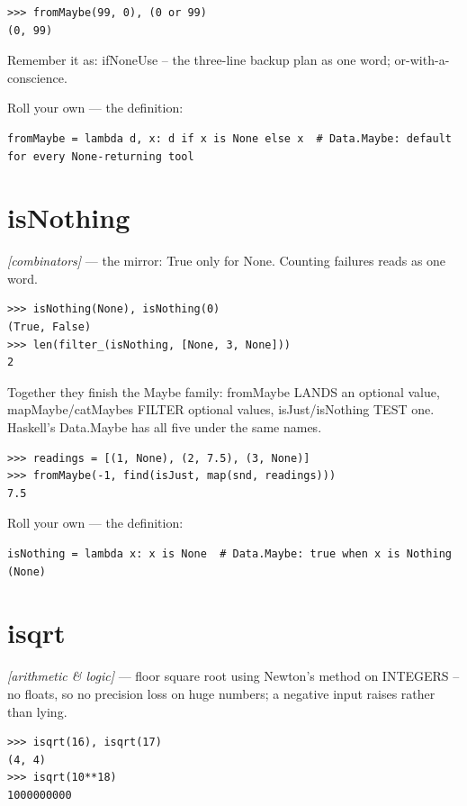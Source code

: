 \documentclass[11pt,letterpaper]{book}
\begin{document}
\begin{lstlisting}[style=spec]
>>> fromMaybe(99, 0), (0 or 99)
(0, 99)
\end{lstlisting}

Remember it as: ifNoneUse -- the three-line backup plan as one word; or-with-a-conscience.


Roll your own --- the definition:

\begin{lstlisting}[style=code]
fromMaybe = lambda d, x: d if x is None else x  # Data.Maybe: default for every None-returning tool
\end{lstlisting}

\section{isNothing}
\noindent\textit{[combinators]} --- the mirror: True only for None. Counting failures reads as one word.
\begin{lstlisting}[style=spec]
>>> isNothing(None), isNothing(0)
(True, False)
>>> len(filter_(isNothing, [None, 3, None]))
2
\end{lstlisting}

Together they finish the Maybe family: fromMaybe LANDS an optional value, mapMaybe/catMaybes FILTER optional values, isJust/isNothing TEST one. Haskell's Data.Maybe has all five under the same names.

\begin{lstlisting}[style=spec]
>>> readings = [(1, None), (2, 7.5), (3, None)]
>>> fromMaybe(-1, find(isJust, map(snd, readings)))
7.5
\end{lstlisting}

Roll your own --- the definition:

\begin{lstlisting}[style=code]
isNothing = lambda x: x is None  # Data.Maybe: true when x is Nothing (None)
\end{lstlisting}

\section{isqrt}
\noindent\textit{[arithmetic \& logic]} --- floor square root using Newton's method on INTEGERS -- no floats, so no precision loss on huge numbers; a negative input raises rather than lying.
\begin{lstlisting}[style=spec]
>>> isqrt(16), isqrt(17)
(4, 4)
>>> isqrt(10**18)
1000000000
\end{lstlisting}
\end{document}
